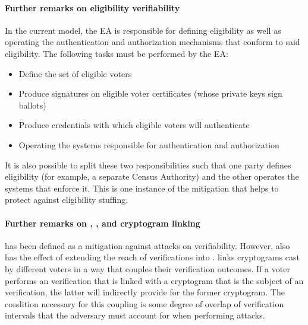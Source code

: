 \documentclass[10pt,letterpaper]{article}
\begin{document}
\paragraph{Further remarks on eligibility verifiability}

In the current model, the EA is responsible for defining eligibility as well as operating the authentication and authorization mechanisms that conform to said eligibility. The following tasks must be performed by the EA:

\begin{itemize}
    \item Define the set of eligible voters
    \item Produce signatures on eligible voter certificates (whose private keys sign ballots)
    \item Produce credentials with which eligible voters will authenticate
    \item Operating the systems responsible for authentication and authorization
\end{itemize}

It is also possible to split these two responsibilities such that one party defines eligibility (for example, a separate Census Authority) and the other operates the systems that enforce it. This is one instance of the \RefFullMTrustDistribution{} mitigation that helps to protect against eligibility stuffing.

\paragraph{Further remarks on \PlainNumMCountedAsRecordedVerifiability{} \PlainNumMRecordedAsCastVerifiability{}, \PlainNumMTamperEvidentBulletinBoard{}, and cryptogram linking}

\RefFullMTamperEvidentBulletinBoard{} has been defined as a mitigation against attacks on verifiability. However, \RefNumMTamperEvidentBulletinBoard{} also has the effect of extending the reach of \RefFullMRecordedAsCastVerifiability{} verifications into \RefFullMCountedAsRecordedVerifiability{}. \RefFullMTamperEvidentBulletinBoard{} links cryptograms cast by different voters in a way that couples their verification outcomes. If a voter performs an \RefNumMRecordedAsCastVerifiability{} verification that is linked with a cryptogram that is the subject of an \RefNumMCountedAsRecordedVerifiability{} verification, the latter will indirectly provide \RefNumMCountedAsRecordedVerifiability{} for the former cryptogram. The condition necessary for this coupling is some degree of overlap of verification intervals that the adversary must account for when performing attacks.
\end{document}
